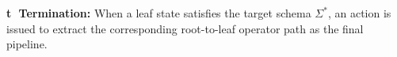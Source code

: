 \begin{example}
%
\textbf{\textcircled{t} Termination:}
When a leaf state satisfies the target schema $\Sigma^\ast$, an  action is issued to extract the corresponding root-to-leaf operator path as the final pipeline.
\end{example}





